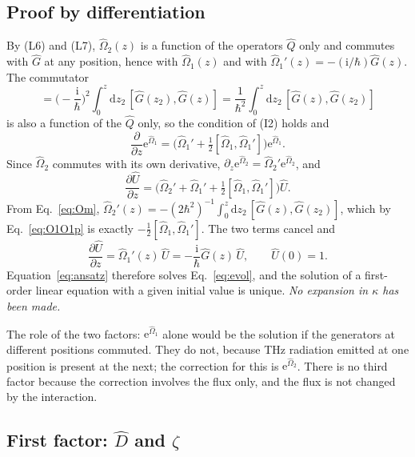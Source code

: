 \documentclass[aps,pra,onecolumn,notitlepage,11pt,amsmath,amssymb,nofootinbib]{revtex4-2}
\newcommand{\Qop}{\hat Q}
\newcommand{\dd}{\mathrm{d}}
\newcommand{\ee}{\mathrm{e}}
\newcommand{\ii}{\mathrm{i}}
\begin{document}
\subsection{Proof by differentiation}

By (L6) and (L7), $\hat\Omega_2(z)$ is a function of the operators $\Qop$ only
and commutes with $\hat G$ at any position, hence with $\hat\Omega_1(z)$ and
with $\hat\Omega_1'(z)=-(\ii/\hbar)\hat G(z)$. The commutator
\begin{equation}
[\hat\Omega_1(z),\hat\Omega_1'(z)]
=\Big(-\frac{\ii}{\hbar}\Big)^{2}\!\int_0^z\!\dd z_2\,[\hat G(z_2),\hat G(z)]
=\frac{1}{\hbar^2}\int_0^z\!\dd z_2\,[\hat G(z),\hat G(z_2)]
\label{eq:O1O1p}
\end{equation}
is also a function of the $\Qop$ only, so the condition of (I2) holds and
\begin{equation}
\frac{\partial}{\partial z}\ee^{\hat\Omega_1}
=\Big(\hat\Omega_1'+\tfrac12[\hat\Omega_1,\hat\Omega_1']\Big)\ee^{\hat\Omega_1}.
\end{equation}
Since $\hat\Omega_2$ commutes with its own derivative,
$\partial_z\ee^{\hat\Omega_2}=\hat\Omega_2'\ee^{\hat\Omega_2}$, and
\begin{equation}
\frac{\partial\hat U}{\partial z}
=\Big(\hat\Omega_2'+\hat\Omega_1'+\tfrac12[\hat\Omega_1,\hat\Omega_1']\Big)\hat U .
\end{equation}
From Eq.~\eqref{eq:Om},
$\hat\Omega_2'(z)=-(2\hbar^2)^{-1}\int_0^z\dd z_2\,[\hat G(z),\hat G(z_2)]$,
which by Eq.~\eqref{eq:O1O1p} is exactly
$-\tfrac12[\hat\Omega_1,\hat\Omega_1']$. The two terms cancel and
\begin{equation}
\frac{\partial\hat U}{\partial z}=\hat\Omega_1'(z)\,\hat U
=-\frac{\ii}{\hbar}\hat G(z)\,\hat U,\qquad \hat U(0)=1 .
\end{equation}
Equation~\eqref{eq:ansatz} therefore solves Eq.~\eqref{eq:evol}, and the
solution of a first-order linear equation with a given initial value is
unique. \emph{No expansion in $\kappa$ has been made.}

The role of the two factors: $\ee^{\hat\Omega_1}$ alone would be the solution
if the generators at different positions commuted. They do not, because THz
radiation emitted at one position is present at the next; the correction for
this is $\ee^{\hat\Omega_2}$. There is no third factor because the correction
involves the flux only, and the flux is not changed by the interaction.

\subsection{First factor: \texorpdfstring{$\hat D$}{D} and \texorpdfstring{$\zeta$}{zeta}}
\label{sec:first}
\end{document}
